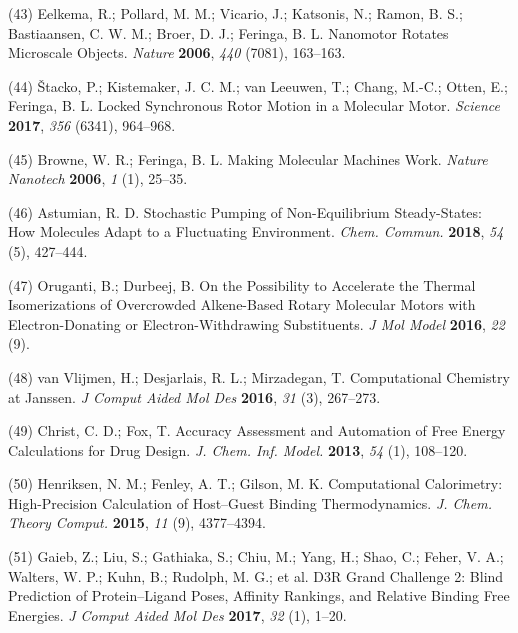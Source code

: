 \documentclass[11pt,notitlepage]{article}
\begin{document}
\leavevmode\hypertarget{ref-thFGBz32}{}%
(43) Eelkema, R.; Pollard, M. M.; Vicario, J.; Katsonis, N.; Ramon, B.
S.; Bastiaansen, C. W. M.; Broer, D. J.; Feringa, B. L. Nanomotor
Rotates Microscale Objects. \emph{Nature} \textbf{2006}, \emph{440}
(7081), 163--163.

\leavevmode\hypertarget{ref-mKSNFvW7}{}%
(44) Štacko, P.; Kistemaker, J. C. M.; van Leeuwen, T.; Chang, M.-C.;
Otten, E.; Feringa, B. L. Locked Synchronous Rotor Motion in a Molecular
Motor. \emph{Science} \textbf{2017}, \emph{356} (6341), 964--968.

\leavevmode\hypertarget{ref-10FsKpWBI}{}%
(45) Browne, W. R.; Feringa, B. L. Making Molecular Machines Work.
\emph{Nature Nanotech} \textbf{2006}, \emph{1} (1), 25--35.

\leavevmode\hypertarget{ref-qhUBHBOM}{}%
(46) Astumian, R. D. Stochastic Pumping of Non-Equilibrium
Steady-States: How Molecules Adapt to a Fluctuating Environment.
\emph{Chem. Commun.} \textbf{2018}, \emph{54} (5), 427--444.

\leavevmode\hypertarget{ref-1AzLiBVkC}{}%
(47) Oruganti, B.; Durbeej, B. On the Possibility to Accelerate the
Thermal Isomerizations of Overcrowded Alkene-Based Rotary Molecular
Motors with Electron-Donating or Electron-Withdrawing Substituents.
\emph{J Mol Model} \textbf{2016}, \emph{22} (9).

\leavevmode\hypertarget{ref-1FiDpP1LR}{}%
(48) van Vlijmen, H.; Desjarlais, R. L.; Mirzadegan, T. Computational
Chemistry at Janssen. \emph{J Comput Aided Mol Des} \textbf{2016},
\emph{31} (3), 267--273.

\leavevmode\hypertarget{ref-1BwXH3GFO}{}%
(49) Christ, C. D.; Fox, T. Accuracy Assessment and Automation of Free
Energy Calculations for Drug Design. \emph{J. Chem. Inf. Model.}
\textbf{2013}, \emph{54} (1), 108--120.

\leavevmode\hypertarget{ref-1935a9V0d}{}%
(50) Henriksen, N. M.; Fenley, A. T.; Gilson, M. K. Computational
Calorimetry: High-Precision Calculation of Host--Guest Binding
Thermodynamics. \emph{J. Chem. Theory Comput.} \textbf{2015}, \emph{11}
(9), 4377--4394.

\leavevmode\hypertarget{ref-LWd10vQy}{}%
(51) Gaieb, Z.; Liu, S.; Gathiaka, S.; Chiu, M.; Yang, H.; Shao, C.;
Feher, V. A.; Walters, W. P.; Kuhn, B.; Rudolph, M. G.; et al. D3R Grand
Challenge 2: Blind Prediction of Protein--Ligand Poses, Affinity
Rankings, and Relative Binding Free Energies. \emph{J Comput Aided Mol
Des} \textbf{2017}, \emph{32} (1), 1--20.
\end{document}
